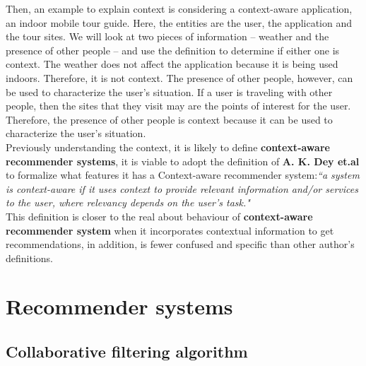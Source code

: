 Then, an example to explain context is considering a context-aware
application, an indoor mobile tour guide. Here, the
entities are the user, the application and the tour sites.  We will
look at two pieces of information – weather and the presence of other
people – and use the definition to determine if either one is context.
The weather does not affect the application because it is being used
indoors. Therefore, it is not context. The presence of other people,
however, can be used to characterize the user’s situation. If a user
is traveling with other people, then the sites that they visit may are
the points of interest for the user. Therefore, the presence of other
people is context because it can be used to characterize the user’s
situation. \\ 
Previously understanding the context, it is likely to define \textbf
{context-aware recommender systems}, it is viable to adopt the
definition of \textbf{A. K. Dey et.al}\cite{dey2001understanding} to
formalize what features it has a Context-aware recommender
system:\textit{``a system is context-aware if it uses context to
provide relevant information and/or services  to the user, where
relevancy depends on the user’s task."} \\  This definition is closer
to the real about behaviour of \textbf{context-aware recommender
system} when it incorporates contextual information to get
recommendations,  in addition, is fewer confused and specific than
other author's definitions.

\section{Recommender systems}

\subsection{Collaborative filtering algorithm}


